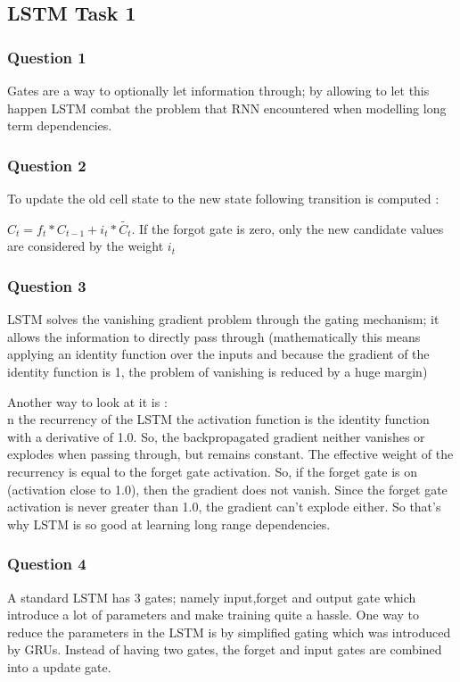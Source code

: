 \documentclass[10pt]{article}
\begin{document}
\subsection{LSTM Task 1 }
\subsubsection{Question 1}
Gates are a way to optionally let information through; by allowing to let this happen LSTM combat the problem that RNN encountered when modelling long term dependencies. 
\subsubsection{Question 2}
To update the old cell state to the new state following transition is computed : 

$C_t = f_t * C_{t-1}+i_t * \widetilde{C_t}$. If the forgot gate is zero, only the new candidate values are considered by the weight $i_t$

\subsubsection{Question 3}
LSTM solves the vanishing gradient problem through the gating mechanism; it allows the information to directly pass through (mathematically this means applying an identity function over the inputs and because the gradient of the identity function is 1, the problem of vanishing is reduced by a huge margin)

Another way to look at it is : \\
n the recurrency of the LSTM the activation function is the identity function with a derivative of 1.0. So, the backpropagated gradient neither vanishes or explodes when passing through, but remains constant.
The effective weight of the recurrency is equal to the forget gate activation. So, if the forget gate is on (activation close to 1.0), then the gradient does not vanish. Since the forget gate activation is never greater than 1.0, the gradient can't explode either.
So that's why LSTM is so good at learning long range dependencies. 

\subsubsection{Question 4}
A standard LSTM has 3 gates; namely input,forget and output gate which introduce a lot of parameters and make training quite a hassle.
One way to reduce the parameters in the LSTM is by simplified gating which was introduced by GRUs. Instead of having two gates, the forget and input gates are combined into a update gate.
\end{document}
